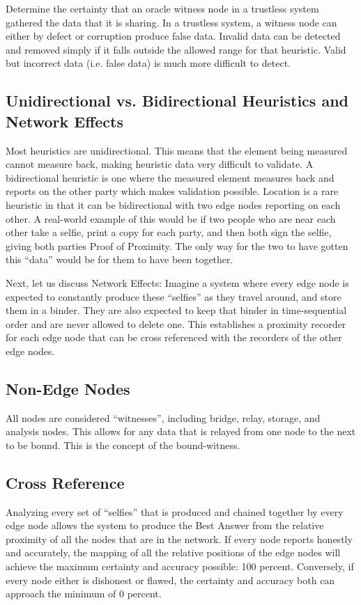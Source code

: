 \documentclass{article}
\begin{document}
Determine the \gls{certainty} that an \gls{oracle} witness node in a trustless system gathered the data that it is sharing. In a trustless system, a witness node can either by defect or corruption produce false data. Invalid data can be detected and removed simply if it falls outside the allowed range for that \gls{heuristic}. Valid but incorrect data (i.e. false data) is much more difficult to detect.

\subsection {Unidirectional vs. Bidirectional Heuristics and Network Effects}
Most \glspl{heuristic} are unidirectional. This means that the element being measured cannot measure back, making heuristic data very difficult to validate. A bidirectional heuristic is one where the measured element measures back and reports on the other party which makes validation possible. Location is a rare heuristic in that it can be bidirectional with two edge nodes reporting on each other. A real-world example of this would be if two people who are near each other take a selfie, print a copy for each party, and then both sign the selfie, giving both parties Proof of Proximity. The only way for the two to have gotten this ``data'' would be for them to have been together.

Next, let us discuss Network Effects: Imagine a system where every edge node is expected to constantly produce these ``selfies'' as they travel around, and store them in a binder. They are also expected to keep that binder in time-sequential order and are never allowed to delete one. This establishes a proximity recorder for each edge node that can be cross referenced with the recorders of the other edge nodes.

\subsection {Non-Edge Nodes}
All nodes are considered ``witnesses'', including bridge, relay, storage, and analysis nodes. This allows for any data that is relayed from one node to the next to be bound. This is the concept of the \Gls{bound-witness}.

\subsection {Cross Reference}
Analyzing every set of ``selfies'' that is produced and chained together by every edge node allows the system to produce the Best Answer from the relative proximity of all the nodes that are in the network. If every node reports honestly and accurately, the mapping of all the relative positions of the edge nodes will achieve the maximum \gls{certainty} and \gls{accuracy} possible: 100 percent. Conversely, if every node either is dishonest or flawed, the certainty and accuracy both can approach the minimum of 0 percent.
\end{document}
